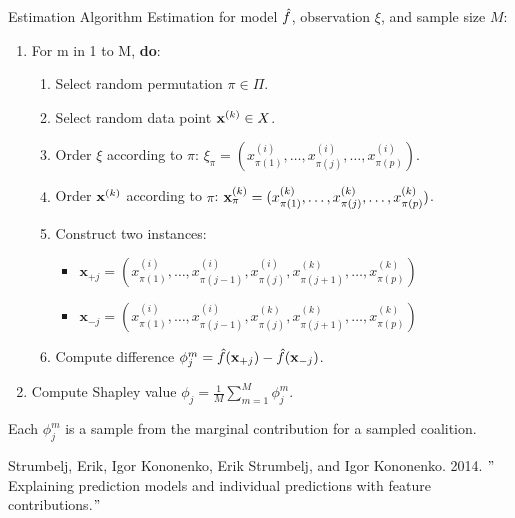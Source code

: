 \documentclass[11pt,compress,t,notes=noshow, xcolor=table]{beamer}
\begin{document}
\begin{vbframe}{Estimation Algorithm}
Estimation for model $\fh$, observation $\xi$, and sample size $M$:
  \begin{enumerate}
      \item For m in 1 to M, \textbf{do}:
      \begin{enumerate}
        \item Select random permutation $\pi \in \Pi$.
        \item Select random data point $\xv^{(k)} \in X$.
        \item Order $\xi$ according to $\pi$: $\xi_{\pi} = (x^{(i)}_{\pi(1)}, \ldots, x^{(i)}_{\pi(j)}, \ldots, x^{(i)}_{\pi(p)})$.
        \item Order $\xk$ according to $\pi$: $\xk_{\pi} = (x^{(k)}_{\pi(1)}, \ldots, x^{(k)}_{\pi(j)}, \ldots, x^{(k)}_{\pi(p)})$.
        \item Construct two instances:
          \begin{itemize}
            \item $\mathbf{x}_{+j} = (x^{(i)}_{\pi(1)}, \ldots, x^{(i)}_{\pi(j - 1)}, x^{(i)}_{\pi(j)}, x^{(k)}_{\pi(j + 1)}, \ldots, x^{(k)}_{\pi(p)}) $
            \item $\mathbf{x}_{-j} = (x^{(i)}_{\pi(1)}, \ldots, x^{(i)}_{\pi(j - 1)}, x^{(k)}_{\pi(j)}, x^{(k)}_{\pi(j + 1)}, \ldots, x^{(k)}_{\pi(p)}) $
          \end{itemize}
        \item Compute difference $\phi_j^m = \fh(\mathbf{x}_{+j}) - \fh(\mathbf{x}_{-j})$.
      \end{enumerate}
    \item Compute Shapley value $\phi_j = \frac{1}{M}\sum_{m=1}^M \phi_j^m$.
  \end{enumerate}

  Each $\phi_j^m$ is a sample from the marginal contribution for a sampled coalition.

  \tiny{Strumbelj, Erik, Igor Kononenko, Erik Strumbelj, and Igor Kononenko. 2014. $"$Explaining prediction models and individual predictions with feature contributions.$"$}

\end{vbframe}
\end{document}
